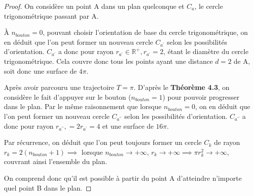 \documentclass{amsart}
\theoremstyle{definition}
\theoremstyle{remark}
\numberwithin{equation}{section}
\begin{document}
\begin{proof}
  On considère un point A dans un plan quelconque et $C_a$, le cercle trigonométrique passant par A.

  À $n_{bouton}=0$, pouvant choisir l'orientation de base du cercle trigonométrique, on en déduit que l'on peut former un nouveau cercle $C_{a^\prime}$ selon les possibilités d'orientation.  $C_{a^\prime}$ a donc pour rayon $r_{a^\prime}\in\mathbb{R^+}, r_{a^\prime}=2$, étant le 
  diamètre du cercle trigonométrique. Cela couvre donc tous les points ayant une distance $d=2$ de A, soit donc une surface de $4\pi$.

  Après avoir parcouru une trajectoire $T=\pi$. D'après le \textbf{Théorème 4.3}, on considère le fait d'appuyer sur le bouton ($n_{bouton}=1$) pour pouvoir progresser dans le plan. Par le même raisonnement que lorsque $n_{bouton}=0$,
  on en déduit que l'on peut former un nouveau cercle $C_{a^{\prime\prime}}$ selon les possibilités d'orientation.  $C_{a^{\prime\prime}}$ a donc pour rayon $r_{a^{\prime\prime}},=2r_{a^\prime}=4$ et une surface de $16\pi$.

  Par récurrence, on déduit que l'on peut toujours former un cercle $C_k$ de rayon $r_k=2(n_{bouton}+1) \implies$ lorsque $n_{bouton}\to+\infty$, $r_k\to+\infty \implies {\pi}r_k^2\to+\infty$, couvrant ainsi l'ensemble du plan.

  On comprend donc qu'il est possible à partir du point A d'atteindre n'importe quel point B dans le plan.



\end{proof}
\end{document}

